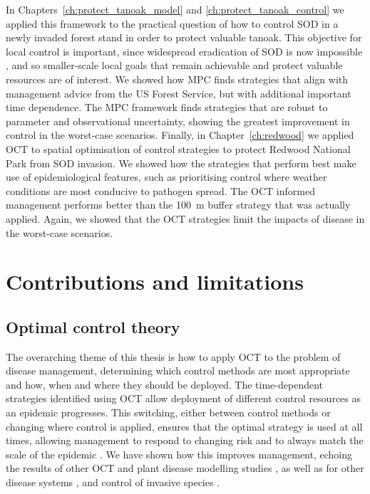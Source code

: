 In Chapters~\ref{ch:protect_tanoak_model} and \ref{ch:protect_tanoak_control} we applied this framework to the practical question of how to control SOD in a newly invaded forest stand in order to protect valuable tanoak. This objective for local control is important, since widespread eradication of SOD is now impossible \citep{cunniffe_modelling_2016}, and so smaller-scale local goals that remain achievable and protect valuable resources are of interest. We showed how MPC finds strategies that align with management advice from the US Forest Service, but with additional important time dependence. The MPC framework finds strategies that are robust to parameter and observational uncertainty, showing the greatest improvement in control in the worst-case scenarios. Finally, in Chapter~\ref{ch:redwood} we applied OCT to spatial optimisation of control strategies to protect Redwood National Park from SOD invasion. We showed how the strategies that perform best make use of epidemiological features, such as prioritising control where weather conditions are most conducive to pathogen spread. The OCT informed management performs better than the \SI{100}{\meter} buffer strategy that was actually applied. Again, we showed that the OCT strategies limit the impacts of disease in the worst-case scenarios.

\section{Contributions and limitations}

\subsection{Optimal control theory}\label{sec:ch8:contributions_oct}

The overarching theme of this thesis is how to apply OCT to the problem of disease management, determining which control methods are most appropriate and how, when and where they should be deployed. The time-dependent strategies identified using OCT allow deployment of different control resources as an epidemic progresses. This switching, either between control methods or changing where control is applied, ensures that the optimal strategy is used at all times, allowing management to respond to changing risk \citep{hyatt-twynam_risk-based_2017} and to always match the scale of the epidemic \citep{gilligan_impact_2007}. We have shown how this improves management, echoing the results of other OCT and plant disease modelling studies \citep[e.g.][]{forster_optimizing_2007, ndeffo_mbah_resource_2011}, as well as for other disease systems \citep{keeling_optimal_2012,klepac_optimizing_2012}, and control of invasive species \citep{carrasco_optimal_2009}.

